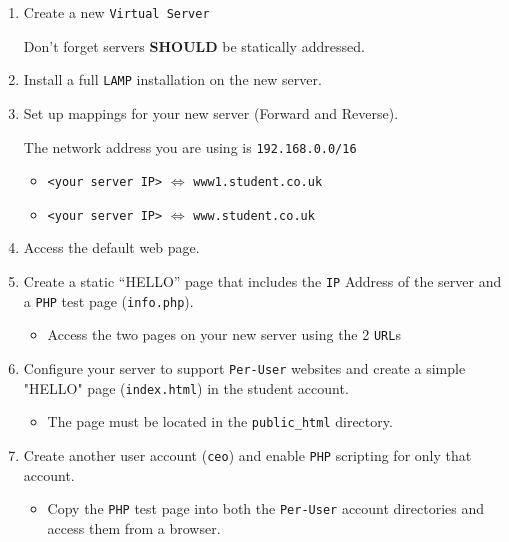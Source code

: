 \documentclass[11pt]{article}
\begin{document}
\begin{enumerate}
    \item Create a new \texttt{Virtual Server} 
        \begin{tcolorbox}[title={\textbf{NOTE:}}]
            \noindent Don't forget servers \textbf{SHOULD} be statically addressed.
        \end{tcolorbox}
    \item Install a full \texttt{LAMP} installation on the new server.
    \item Set up mappings for your new server (Forward and Reverse).
        \begin{tcolorbox}[title={\textbf{NOTE:}}]
            \noindent The network address you are using is \texttt{192.168.0.0/16}
        \end{tcolorbox}
        \begin{itemize}
            \item \texttt{<your server IP>} $\Leftrightarrow$ \texttt{www1.student.co.uk}
            \item \texttt{<your server IP>} $\Leftrightarrow$ \texttt{www.student.co.uk}
        \end{itemize}
    \item Access the default web page.
    \item Create a static ``HELLO'' page that includes the \texttt{IP} Address of the server and a \texttt{PHP} test page (\texttt{info.php}).
        \begin{itemize}
            \item Access the two pages on your new server using the 2 \texttt{URL}s
        \end{itemize}
    \item Configure your server to support \texttt{Per-User} websites and create a simple "HELLO" page (\texttt{index.html}) in the student account.
        \begin{itemize}
            \item The page must be located in the \texttt{public\_html} directory.
        \end{itemize}
    \item Create another user account (\texttt{ceo}) and enable \texttt{PHP} scripting for only that account.
        \begin{itemize}
            \item Copy the \texttt{PHP} test page into both the \texttt{Per-User} account directories and access them from a browser.
                \begin{tcolorbox}[title={\textbf{NOTE:}}]

\end{tcolorbox}
\end{itemize}
\end{enumerate}
\end{document}
